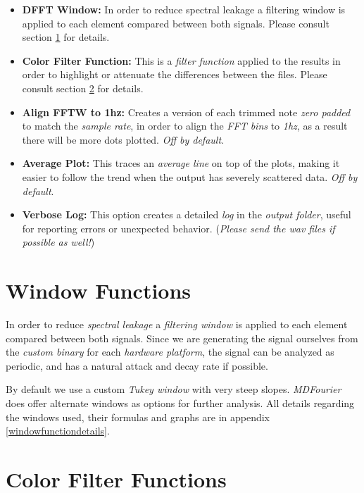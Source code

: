 \documentclass[10pt,a4paper]{report}
\begin{document}
\begin{itemize}
	\item \textbf{DFFT Window:} In order to reduce spectral leakage a filtering window is applied to each element compared between both signals. Please consult section \ref{windows} for details. 
	\item \textbf{Color Filter Function:} This is a \textit{filter function} applied to the results in order to highlight or attenuate the differences between the files.  Please consult section \ref{colorfilter} for details. 
	\item \textbf{Align FFTW to 1hz:} Creates a version of each trimmed note \textit{zero padded} to match the \textit{sample rate}, in order to align the \textit{FFT bins} to \textit{1hz}, as a  result there will be more dots plotted. \textit{Off by default}.
	\item \textbf{Average Plot:} This traces an \textit{average line} on top of the plots, making it easier to follow the trend when the output has severely scattered data. \textit{Off by default}.
	\item \textbf{Verbose Log:} This option creates a detailed \textit{log} in the \textit{output folder}, useful for reporting errors or unexpected behavior. (\textit{Please send the wav files if possible as well!})
\end{itemize}

\section{Window Functions}
\label{windows}

In order to reduce \textit{spectral leakage} a \textit{filtering window} is applied to each element compared between both signals. Since we are generating the signal ourselves from the \textit{custom binary} for each \textit{hardware platform}, the signal can be analyzed as periodic, and has a natural attack and decay rate if possible.

By default we use a custom \textit{Tukey window} with very steep slopes. \textit{MDFourier} does offer alternate windows as options for further analysis. All details regarding the windows used, their formulas and graphs are in appendix \ref{windowfunctiondetails}.

\section{Color Filter Functions}
\label{colorfilter}
\end{document}
